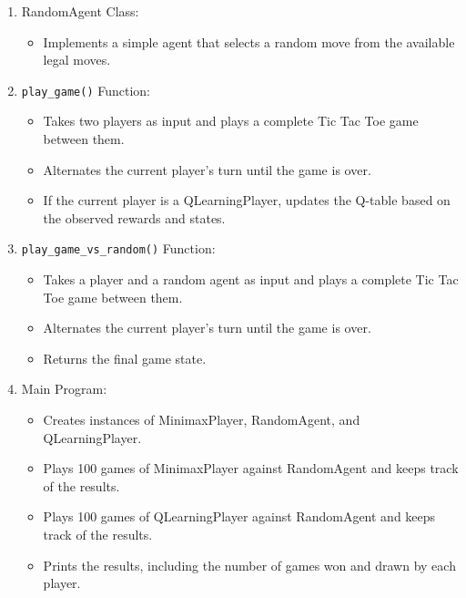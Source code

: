 \documentclass{article}
\begin{document}
\begin{enumerate}
  \item RandomAgent Class:
    \begin{itemize}
      \item Implements a simple agent that selects a random move from the available legal moves.
    \end{itemize}

  \item \texttt{play\_game()} Function:
    \begin{itemize}
      \item Takes two players as input and plays a complete Tic Tac Toe game between them.
      \item Alternates the current player's turn until the game is over.
      \item If the current player is a QLearningPlayer, updates the Q-table based on the observed rewards and states.
    \end{itemize}

  \item \texttt{play\_game\_vs\_random()} Function:
    \begin{itemize}
      \item Takes a player and a random agent as input and plays a complete Tic Tac Toe game between them.
      \item Alternates the current player's turn until the game is over.
      \item Returns the final game state.
    \end{itemize}

  \item Main Program:
    \begin{itemize}
      \item Creates instances of MinimaxPlayer, RandomAgent, and QLearningPlayer.
      \item Plays 100 games of MinimaxPlayer against RandomAgent and keeps track of the results.
      \item Plays 100 games of QLearningPlayer against RandomAgent and keeps track of the results.
      \item Prints the results, including the number of games won and drawn by each player.
    \end{itemize}
\end{enumerate}
\end{document}
